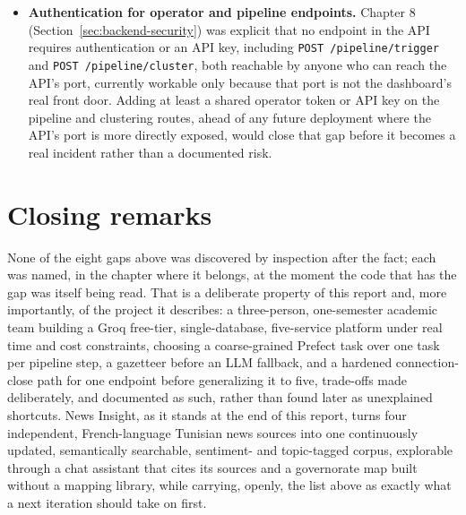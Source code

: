 \begin{sloppypar}
\begin{itemize}
    \item \textbf{Authentication for operator and pipeline endpoints.} Chapter 8 (Section~\ref{sec:backend-security}) was explicit that no endpoint in the API requires authentication or an API key, including \texttt{POST /pipeline/\allowbreak trigger} and \texttt{POST /pipeline/\allowbreak cluster}, both reachable by anyone who can reach the API's port, currently workable only because that port is not the dashboard's real front door. Adding at least a shared operator token or API key on the pipeline and clustering routes, ahead of any future deployment where the API's port is more directly exposed, would close that gap before it becomes a real incident rather than a documented risk.
\end{itemize}
\end{sloppypar}

\section{Closing remarks}
\label{sec:closing-remarks}
\begin{sloppypar}
None of the eight gaps above was discovered by inspection after the fact; each was named, in the chapter where it belongs, at the moment the code that has the gap was itself being read. That is a deliberate property of this report and, more importantly, of the project it describes: a three-person, one-semester academic team building a Groq free-tier, single-database, five-service platform under real time and cost constraints, choosing a coarse-grained Prefect task over one task per pipeline step, a gazetteer before an LLM fallback, and a hardened connection-close path for one endpoint before generalizing it to five, trade-offs made deliberately, and documented as such, rather than found later as unexplained shortcuts. News Insight, as it stands at the end of this report, turns four independent, French-language Tunisian news sources into one continuously updated, semantically searchable, sentiment- and topic-tagged corpus, explorable through a chat assistant that cites its sources and a governorate map built without a mapping library, while carrying, openly, the list above as exactly what a next iteration should take on first.
\end{sloppypar}
